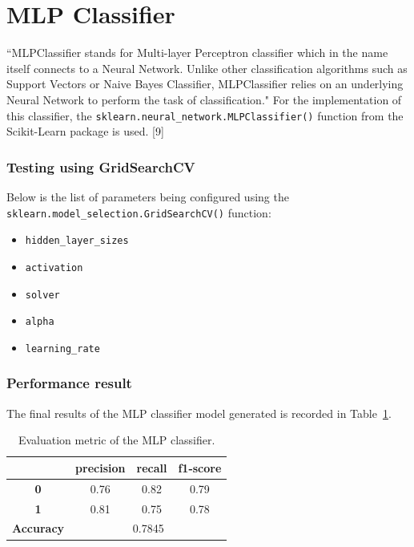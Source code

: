\documentclass[a4paper]{report}
\newcommand{\code}[1]{\texttt{#1}}
\begin{document}
{{\section{MLP Classifier}
“MLPClassifier stands for Multi-layer Perceptron classifier which in the name itself connects to a Neural Network. Unlike other classification algorithms such as Support Vectors or Naive Bayes Classifier, MLPClassifier relies on an underlying Neural Network to perform the task of classification." For the implementation of this classifier, the \code{sklearn.neural\_network.MLPClassifier()} function from the Scikit-Learn package is used. [9]

\subsubsection{Testing using GridSearchCV}
Below is the list of parameters being configured using the \code{sklearn.model\_selection.GridSearchCV()} function:

\begin{itemize}
	\item \code{hidden\_layer\_sizes}
	\item \code{activation}
	\item \code{solver}
	\item \code{alpha}
	\item \code{learning\_rate}
\end{itemize}

\subsubsection{Performance result}
The final results of the MLP classifier model generated is recorded in Table~\ref{table:MLP_performance}. 

\begin{table}[h!]
\centering
\begin{tabular}{  c | c | c | c |}
\cline{2-4}
&  \textbf { precision } &  \textbf  { recall } & \textbf  { f1-score }  \\
\hline
\multicolumn{1}{|c|}{ \textbf {0}} & 0.76 & 0.82 & 0.79 \\
\hline
\multicolumn{1}{|c|}{ \textbf {1}} & 0.81 & 0.75 & 0.78 \\
\hline
\hline
\multicolumn{1}{|c|}{ \textbf {Accuracy}} & \multicolumn{3}{|c|}{0.7845} \\
\hline
\end{tabular}
\caption{Evaluation metric of the MLP classifier.}
\label{table:MLP_performance}
\end{table}

}}
\end{document}
